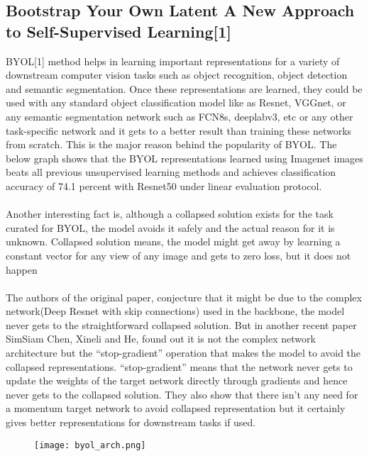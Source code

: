 \documentclass[a4paper, 12pt]{article}
\begin{document}
\subsection{Bootstrap Your Own Latent A New Approach to Self-Supervised Learning[1]}
\hspace{1cm}
BYOL[1] method helps in learning important representations for a variety of downstream computer vision tasks such as object recognition, object detection and semantic segmentation. Once these representations are learned, they could be used with any standard object classification model like as Resnet, VGGnet, or any semantic segmentation network such as FCN8s, deeplabv3, etc or any other task-specific network and it gets to a better result than training these networks from scratch. This is the major reason behind the popularity of BYOL. The below graph shows that the BYOL representations learned using Imagenet images beats all previous unsupervised learning methods and achieves classification accuracy of 74.1 percent with Resnet50 under linear evaluation protocol.\\
\\
Another interesting fact is, although a collapsed solution exists for the task curated for BYOL, the model avoids it safely and the actual reason for it is unknown. Collapsed solution means, the model might get away by learning a constant vector for any view of any image and gets to zero loss, but it does not happen\\
\\
The authors of the original paper, conjecture that it might be due to the complex network(Deep Resnet with skip connections) used in the backbone, the model never gets to the straightforward collapsed solution. But in another recent paper SimSiam Chen, Xineli and He, found out it is not the complex network architecture but the “stop-gradient” operation that makes the model to avoid the collapsed representations. “stop-gradient” means that the network never gets to update the weights of the target network directly through gradients and hence never gets to the collapsed solution. They also show that there isn’t any need for a momentum target network to avoid collapsed representation but it certainly gives better representations for downstream tasks if used.

\begin{figure}[htp]
    \centering
    \texttt{[image: byol\_arch.png]}

\end{figure}
\end{document}
